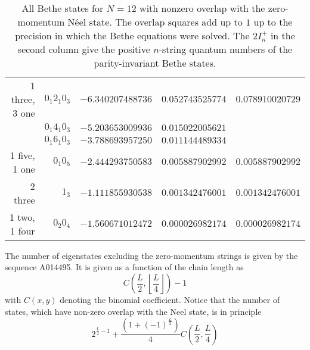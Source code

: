 \documentclass[12pt,a4paper,final]{iopart}
\begin{document}
\begin{table}[h]
\begin{tabular}{rrrrr}
    \midrule
1 three, 3 one &$0_1 2_1 0_3$ & $-6.340207488736$ & $0.052743525774$ & $0.078910020729$ \\
  &$0_1 4_1 0_3$ & $-5.203653009936$ & $0.015022005621$ \\
  &$0_1 6_1 0_3$ & $-3.788693957250$ & $0.011144489334$ \\
      \midrule
1 five, 1 one &$0_1 0_5$ & $-2.444293750583$ & $0.005887902992$ & $0.005887902992$ \\
      \midrule
2 three &$1_3$ & $-1.111855930538$ & $0.001342476001$ & $0.001342476001$ \\
      \midrule
1 two, 1 four &$0_2 0_4$ & $-1.560671012472$ & $0.000026982174$ & $0.000026982174$ \\
  \bottomrule
 \end{tabular}
\caption{All Bethe states for $N=12$ with nonzero overlap with the zero-momentum N\'eel state. The overlap squares add up to $1$ up to the precision in which the Bethe equations were solved. The $2I^+_n$ in the second column give the positive $n$-string quantum numbers of the parity-invariant Bethe states.}
\label{table:RV:sumruleN12}
\end{table}

The number of eigenstates excluding the zero-momentum strings is given by the sequence A014495.
It is given as a function of the chain length as 
%
\begin{equation}
C\left(\frac{L}{2},\left\lfloor\frac{L}{4}\right\rfloor\right)-1
\end{equation}
%
with $C(x,y)$ denoting the binomial coefficient. Notice that the number of states, which have non-zero 
overlap with the Neel state, is in principle 
%
\begin{equation}
2^{\frac{L}{2}-1}+\frac{(1+(-1)^{\frac{L}{2}})}{4}C\left(\frac{L}{2},\frac{L}{4}\right)
\end{equation}
%
\end{document}

